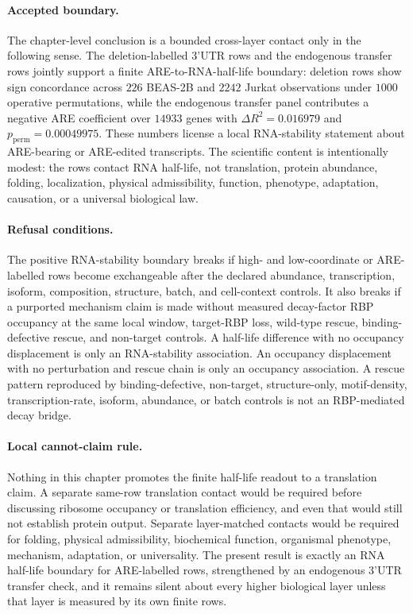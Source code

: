\paragraph{Accepted boundary.}
The chapter-level conclusion is a bounded cross-layer contact only in the following sense.  The deletion-labelled 3'UTR rows and the endogenous transfer rows jointly support a finite ARE-to-RNA-half-life boundary: deletion rows show sign concordance across $226$ BEAS-2B and $2242$ Jurkat observations under $1000$ operative permutations, while the endogenous transfer panel contributes a negative ARE coefficient over $14933$ genes with $\Delta R^2=0.016979$ and $p_{\mathrm{perm}}=0.00049975$.  These numbers license a local RNA-stability statement about ARE-bearing or ARE-edited transcripts.  The scientific content is intentionally modest: the rows contact RNA half-life, not translation, protein abundance, folding, localization, physical admissibility, function, phenotype, adaptation, causation, or a universal biological law.

\paragraph{Refusal conditions.}
The positive RNA-stability boundary breaks if high- and low-coordinate or ARE-labelled rows become exchangeable after the declared abundance, transcription, isoform, composition, structure, batch, and cell-context controls.  It also breaks if a purported mechanism claim is made without measured decay-factor RBP occupancy at the same local window, target-RBP loss, wild-type rescue, binding-defective rescue, and non-target controls.  A half-life difference with no occupancy displacement is only an RNA-stability association.  An occupancy displacement with no perturbation and rescue chain is only an occupancy association.  A rescue pattern reproduced by binding-defective, non-target, structure-only, motif-density, transcription-rate, isoform, abundance, or batch controls is not an RBP-mediated decay bridge.

\paragraph{Local cannot-claim rule.}
Nothing in this chapter promotes the finite half-life readout to a translation claim.  A separate same-row translation contact would be required before discussing ribosome occupancy or translation efficiency, and even that would still not establish protein output.  Separate layer-matched contacts would be required for folding, physical admissibility, biochemical function, organismal phenotype, mechanism, adaptation, or universality.  The present result is exactly an RNA half-life boundary for ARE-labelled rows, strengthened by an endogenous 3'UTR transfer check, and it remains silent about every higher biological layer unless that layer is measured by its own finite rows.